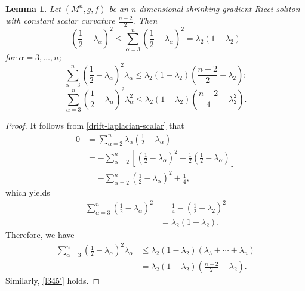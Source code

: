 \documentclass[a4, 12pt]{amsart}
\theoremstyle{plain}
\newtheorem{lem}[theo]{Lemma}
\begin{document}
\begin{lem}\label{lambda-estimates}
	Let $(M^n, g, f)$ be an $n$-dimensional shrinking gradient Ricci soliton with constant scalar curvature $\frac{n-2}{2}$. Then
	\begin{equation}\label{la}
		\left(\frac{1}{2} - \lambda_\alpha\right)^2 \leq \sum_{\alpha=3}^n\left(\frac{1}{2} - \lambda_\alpha\right)^2 = \lambda_2(1 - \lambda_2)
	\end{equation}
	for $\alpha = 3, \ldots, n$;
	\begin{equation}\label{l345}
		\sum_{\alpha=3}^n\left(\frac{1}{2} - \lambda_\alpha\right)^2\lambda_\alpha \leq \lambda_2(1 - \lambda_2)\left(\frac{n-2}{2} - \lambda_2\right);
	\end{equation}
	\begin{equation}\label{l345'}
		\sum_{\alpha=3}^n\left(\frac{1}{2} - \lambda_\alpha\right)^2\lambda_\alpha^2 \leq \lambda_2(1 - \lambda_2)\left(\frac{n-2}{4} - \lambda_2^2\right).
	\end{equation}
\end{lem}

\begin{proof}
	It follows from \eqref{drift-laplacian-scalar} that
	\begin{equation*}\label{sum-identity}
		\begin{aligned}
			0 &= \sum_{\alpha=2}^n\lambda_\alpha\left(\frac{1}{2} - \lambda_\alpha\right) \\
			&= -\sum_{\alpha=2}^n\left[\left(\frac{1}{2} - \lambda_\alpha\right)^2 + \frac{1}{2}\left(\frac{1}{2} - \lambda_\alpha\right)\right] \\
			&= -\sum_{\alpha=2}^n\left(\frac{1}{2} - \lambda_\alpha\right)^2 + \frac{1}{4},
		\end{aligned}
	\end{equation*}
	which yields
	\begin{equation*}\label{lambda2-identity}
		\begin{aligned}
			\sum_{\alpha=3}^n\left(\frac{1}{2} - \lambda_\alpha\right)^2 &= \frac{1}{4} - \left(\frac{1}{2} - \lambda_2\right)^2 \\
			&= \lambda_2(1 - \lambda_2).
		\end{aligned}
	\end{equation*}
	Therefore, we have
	\begin{equation*}\label{l345-proof}
		\begin{aligned}
			\sum_{\alpha=3}^n\left(\frac{1}{2} - \lambda_\alpha\right)^2\lambda_\alpha &\leq \lambda_2(1 - \lambda_2)(\lambda_3 + \cdots + \lambda_n) \\
			&= \lambda_2(1 - \lambda_2)\left(\frac{n-2}{2} - \lambda_2\right).
		\end{aligned}
	\end{equation*}
	Similarly, \eqref{l345'} holds.
\end{proof}
\end{document}
